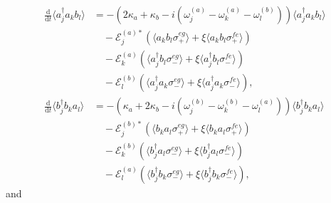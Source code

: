 \documentclass{article}
\newcommand{\ddt}[1][]{\frac{\mathrm{d} #1}{\mathrm{d}t}}
\begin{document}
\begin{subequations}
	\begin{align}
		\ddt \langle a^{\dagger}_{j} a_{k} b_{l} \rangle &= -\left( 2\kappa_{a} + \kappa_{b} - i \left( \omega_{j}^{(a)} - \omega_{k}^{(a)} - \omega_{l}^{(b)} \right) \right) \langle a^{\dagger}_{j} a_{k} b_{l} \rangle \nonumber \\
		&\quad - \mathcal{E}_{j}^{(a) *} \left( \langle a_{k} b_{l} \sigma^{eg}_{+} \rangle + \xi \langle a_{k} b_{l} \sigma^{fe}_{+} \rangle \right) \nonumber \\
		&\quad - \mathcal{E}_{k}^{(a)} \left( \langle a^{\dagger}_{j} b_{l} \sigma^{eg}_{-} \rangle + \xi \langle a^{\dagger}_{j} b_{l} \sigma^{fe}_{-} \rangle \right) \nonumber \\
		&\quad - \mathcal{E}_{l}^{(b)} \left( \langle a^{\dagger}_{j} a_{k} \sigma^{eg}_{-} \rangle + \xi \langle a^{\dagger}_{j} a_{k} \sigma^{fe}_{-} \rangle \right) , \\
		\ddt \langle b^{\dagger}_{j} b_{k} a_{l} \rangle &= -\left( \kappa_{a} + 2\kappa_{b} - i \left( \omega_{j}^{(b)} - \omega_{k}^{(b)} - \omega_{l}^{(a)} \right) \right) \langle b^{\dagger}_{j} b_{k} a_{l} \rangle \nonumber \\
		&\quad - \mathcal{E}_{j}^{(b) *} \left( \langle b_{k} a_{l} \sigma^{eg}_{+} \rangle + \xi \langle b_{k} a_{l} \sigma^{fe}_{+} \rangle \right) \nonumber \\
		&\quad - \mathcal{E}_{k}^{(b)} \left( \langle b^{\dagger}_{j} a_{l} \sigma^{eg}_{-} \rangle + \xi \langle b^{\dagger}_{j} a_{l} \sigma^{fe}_{-} \rangle \right) \nonumber \\
		&\quad - \mathcal{E}_{l}^{(a)} \left( \langle b^{\dagger}_{j} b_{k} \sigma^{eg}_{-} \rangle + \xi \langle b^{\dagger}_{j} b_{k} \sigma^{fe}_{-} \rangle \right) ,
	\end{align}
\end{subequations}
and
\end{document}
